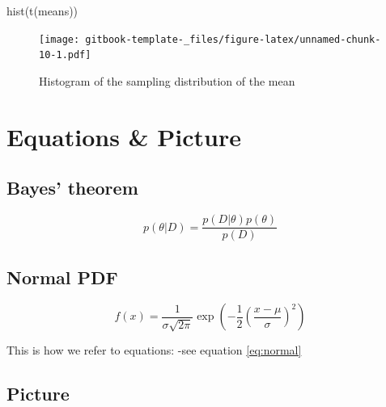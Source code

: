 \documentclass[
]{book}
\newenvironment{Shaded}{\begin{snugshade}}{\end{snugshade}}
\newcommand{\FunctionTok}[1]{\textcolor[rgb]{0.00,0.00,0.00}{#1}}
\newcommand{\NormalTok}[1]{#1}
\begin{document}
\begin{Shaded}
\begin{Highlighting}[]
\FunctionTok{hist}\NormalTok{(}\FunctionTok{t}\NormalTok{(means))}
\end{Highlighting}
\end{Shaded}

\begin{figure}
\centering
\texttt{[image: gitbook-template-\_files/figure-latex/unnamed-chunk-10-1.pdf]}
\caption{\label{fig:unnamed-chunk-10}Histogram of the sampling distribution of the mean}
\end{figure}

\hypertarget{equations-picture}{%
\chapter{Equations \& Picture}\label{equations-picture}}

\hypertarget{bayes-theorem}{%
\section{Bayes' theorem}\label{bayes-theorem}}

\begin{equation} 
p(\theta | D) = \frac{p(D|\theta) p(\theta)} {p(D)}
\label{eq:bayes}
\end{equation}

\hypertarget{normal-pdf}{%
\section{Normal PDF}\label{normal-pdf}}

\begin{equation} 
f(x) = \frac{1}{\sigma\sqrt{2\pi}}\exp\left(-\frac{1}{2}\left(\frac{x-\mu}{\sigma}\right)^{2}\right)
\label{eq:normal}
\end{equation}

This is how we refer to equations:
-see equation \eqref{eq:normal}

\hypertarget{picture}{%
\section{Picture}\label{picture}}
\end{document}
